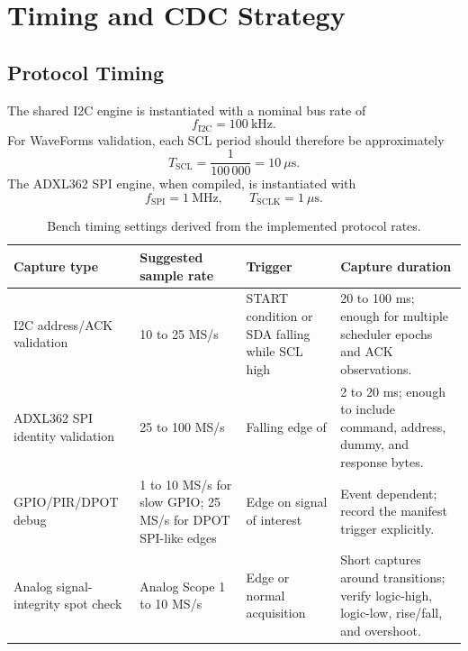 \documentclass[11pt]{article}
\newcommand{\sig}[1]{\texttt{\detokenize{#1}}}
\begin{document}
\section{Timing and CDC Strategy}
\label{sec:timing-cdc}

\subsection{Protocol Timing}

The shared I2C engine is instantiated with a nominal bus rate of
\begin{equation}
    f_{\mathrm{I2C}} = 100~\mathrm{kHz}.
    \label{eq:i2c}
\end{equation}
For WaveForms validation, each SCL period should therefore be approximately
\begin{equation}
    T_{\mathrm{SCL}} = \frac{1}{100\,000}=10~\mu\mathrm{s}.
    \label{eq:i2c-period}
\end{equation}
The ADXL362 SPI engine, when compiled, is instantiated with
\begin{equation}
    f_{\mathrm{SPI}} = 1~\mathrm{MHz}, \qquad
    T_{\mathrm{SCLK}} = 1~\mu\mathrm{s}.
    \label{eq:spi-period}
\end{equation}

\begin{table}[htbp]
\centering
\caption{Bench timing settings derived from the implemented protocol rates.}
\label{tab:bench-timing}
\small
\begin{tabularx}{\textwidth}{@{}p{}p{}p{}X@{}}
\toprule
Capture type & Suggested sample rate & Trigger & Capture duration \\
\midrule
I2C address/ACK validation & 10 to 25 MS/s & START condition or SDA falling while SCL high & 20 to 100 ms; enough for multiple scheduler epochs and ACK observations. \\
ADXL362 SPI identity validation & 25 to 100 MS/s & Falling edge of \sig{acl2_cs_n} & 2 to 20 ms; enough to include command, address, dummy, and response bytes. \\
GPIO/PIR/DPOT debug & 1 to 10 MS/s for slow GPIO; 25 MS/s for DPOT SPI-like edges & Edge on signal of interest & Event dependent; record the manifest trigger explicitly. \\
Analog signal-integrity spot check & Analog Scope 1 to 10 MS/s & Edge or normal acquisition & Short captures around transitions; verify logic-high, logic-low, rise/fall, and overshoot. \\
\bottomrule
\end{tabularx}
\end{table}
\end{document}
